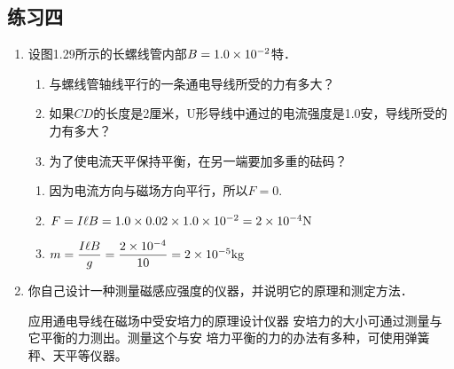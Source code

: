 \subsection{练习四}
\begin{enumerate}
    \item 设图1.29所示的长螺线管内部$B=1.0\times10^{-2}$特．
    \begin{enumerate}
        \item 与螺线管轴线平行的一条通电导线所受的力有多大？
        \item 如果$CD$的长度是2厘米，U形导线中通过的电流强度是1.0安，导线所受的力有多大？
        \item 为了使电流天平保持平衡，在另一端要加多重的砝码？
    \end{enumerate}


    \begin{solution}
\begin{enumerate}
    \item 因为电流方向与磁场方向平行，所以$F=0$.
    \item $F=I\ell B=1.0\times0.02\times1.0\times10^{-2}=2\times10^{-4}{\rm N}$
    \item $m=\dfrac{I\ell B}{g}=\dfrac{2\times10^{-4}}{10}=2\times10^{-5}{\rm kg}$
\end{enumerate}

    \end{solution}
    
    \item 你自己设计一种测量磁感应强度的仪器，并说明它的原理和测定方法．

    \begin{solution}
    应用通电导线在磁场中受安培力的原理设计仪器
安培力的大小可通过测量与它平衡的力测出。测量这个与安
培力平衡的力的办法有多种，可使用弹簧秤、天平等仪器。
    \end{solution}
    
\end{enumerate}




